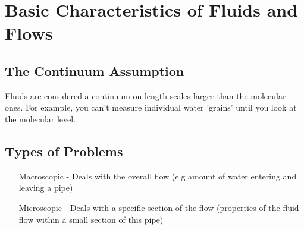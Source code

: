\documentclass[12pt,a4paper]{article}
\begin{document}
    \newpage

    \section{Basic Characteristics of Fluids and Flows}
        \subsection{The Continuum Assumption}
            Fluids are considered a continuum on length scales larger than the molecular ones. For example, you can't measure individual water 'grains' until you look at the molecular level.
        
        \subsection{Types of Problems}
            \begin{itemize}
                \item[Macroscopic - ] Deals with the overall flow (e.g amount of water entering and leaving a pipe)
                \item[Microscopic - ] Deals with a specific section of the flow (properties of the fluid flow within a small section of this pipe)
            \end{itemize}
\end{document}
